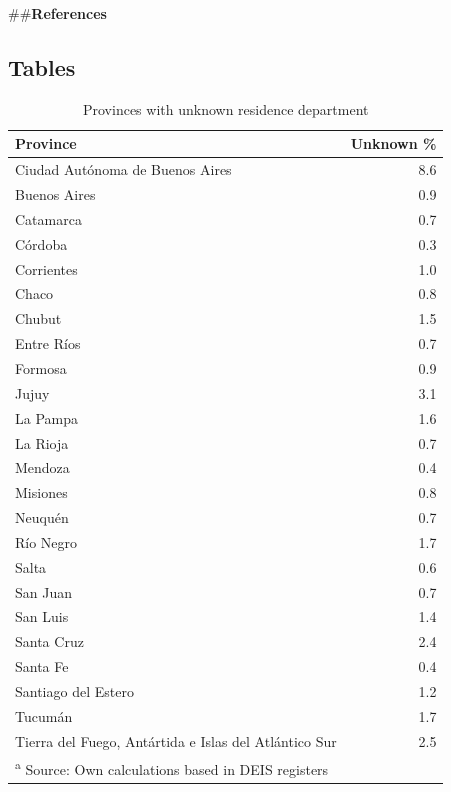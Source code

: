 \documentclass[12pt,]{article}
\begin{document}
\#\#\textbf{References}

\hypertarget{tables}{%
\subsection{Tables}\label{tables}}

\begin{table}

\caption{\label{tab:SinDEP}Provinces with unknown residence department}
\centering
\begin{tabular}[t]{l|r}
\hline
Province & Unknown \%\\
\hline
Ciudad Autónoma de Buenos Aires & 8.6\\
\hline
Buenos Aires & 0.9\\
\hline
Catamarca & 0.7\\
\hline
Córdoba & 0.3\\
\hline
Corrientes & 1.0\\
\hline
Chaco & 0.8\\
\hline
Chubut & 1.5\\
\hline
Entre Ríos & 0.7\\
\hline
Formosa & 0.9\\
\hline
Jujuy & 3.1\\
\hline
La Pampa & 1.6\\
\hline
La Rioja & 0.7\\
\hline
Mendoza & 0.4\\
\hline
Misiones & 0.8\\
\hline
Neuquén & 0.7\\
\hline
Río Negro & 1.7\\
\hline
Salta & 0.6\\
\hline
San Juan & 0.7\\
\hline
San Luis & 1.4\\
\hline
Santa Cruz & 2.4\\
\hline
Santa Fe & 0.4\\
\hline
Santiago del Estero & 1.2\\
\hline
Tucumán & 1.7\\
\hline
Tierra del Fuego, Antártida e Islas del Atlántico Sur & 2.5\\
\hline
\multicolumn{2}{l}{\textsuperscript{a} Source: Own calculations based in DEIS registers}\\
\end{tabular}
\end{table}
\end{document}
